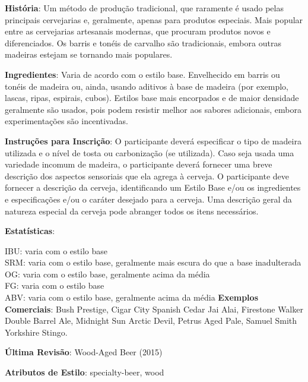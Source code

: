\textbf{História}: Um método de produção tradicional, que raramente é usado pelas principais cervejarias e, geralmente, apenas para produtos especiais. Mais popular entre as cervejarias artesanais modernas, que procuram produtos novos e diferenciados. Os barris e tonéis de carvalho são tradicionais, embora outras madeiras estejam se tornando mais populares.

\textbf{Ingredientes}: Varia de acordo com o estilo base. Envelhecido em barris ou tonéis de madeira ou, ainda, usando aditivos à base de madeira (por exemplo, lascas, ripas, espirais, cubos). Estilos base mais encorpados e de maior densidade geralmente são usados, pois podem resistir melhor aos sabores adicionais, embora experimentações são incentivadas.

\textbf{Instruções para Inscrição}: O participante deverá especificar o tipo de madeira utilizada e o nível de tosta ou carbonização (se utilizada). Caso seja usada uma variedade incomum de madeira, o participante deverá fornecer uma breve descrição dos aspectos sensoriais que ela agrega à cerveja. O participante deve fornecer a descrição da cerveja, identificando um Estilo Base e/ou os ingredientes e especificações e/ou o caráter desejado para a cerveja. Uma descrição geral da natureza especial da cerveja pode abranger todos os itens necessários.

\textbf{Estatísticas}:

IBU: varia com o estilo base\\
SRM: varia com o estilo base, geralmente mais escura do que a base inadulterada\\
OG: varia com o estilo base, geralmente acima da média\\
FG: varia com o estilo base\\
ABV: varia com o estilo base, geralmente acima da média
\textbf{Exemplos Comerciais}: Bush Prestige, Cigar City Spanish Cedar Jai Alai, Firestone Walker Double Barrel Ale, Midnight Sun Arctic Devil, Petrus Aged Pale, Samuel Smith Yorkshire Stingo.

\textbf{Última Revisão}: Wood-Aged Beer (2015)

\textbf{Atributos de Estilo}: specialty-beer, wood
